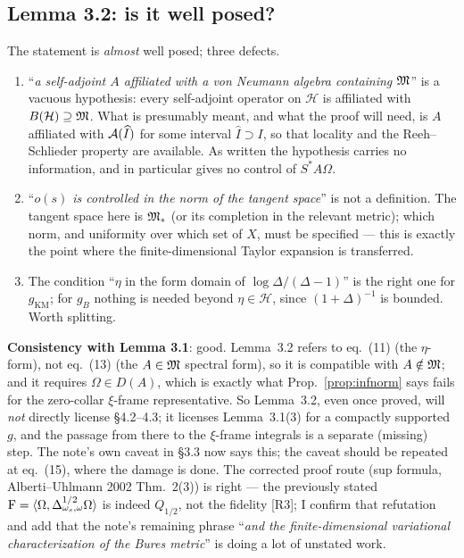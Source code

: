 \documentclass[11pt]{article}
\begin{document}
\subsection{Lemma 3.2: is it well posed?}
\begin{verdictgap}
The statement is \emph{almost} well posed; three defects.
\begin{enumerate}[leftmargin=1.6em]
\item ``\emph{a self-adjoint $A$ affiliated with a von Neumann algebra containing $\mathfrak M$}'' is a vacuous
hypothesis: every self-adjoint operator on $\mathcal H$ is affiliated with $B(\mathcal H)\supseteq\mathfrak M$.  What is
presumably meant, and what the proof will need, is $A$ affiliated with $\mathcal A(\widehat I)$ for some interval
$\widehat I\supset I$, so that locality and the Reeh--Schlieder property are available.  As written the
hypothesis carries no information, and in particular gives no control of $S^*A\Omega$.
\item ``\emph{$o(s)$ is controlled in the norm of the tangent space}'' is not a definition.  The tangent space
here is $\mathfrak M_*$ (or its completion in the relevant metric); which norm, and uniformity over which set of $X$,
must be specified --- this is exactly the point where the finite-dimensional Taylor expansion is transferred.
\item The condition ``$\eta$ in the form domain of $\log\Delta/(\Delta-1)$'' is the right one for
$g_{\mathrm{KM}}$; for $g_B$ nothing is needed beyond $\eta\in\mathcal H$, since $(1+\Delta)^{-1}$ is bounded.
Worth splitting.
\end{enumerate}
\textbf{Consistency with Lemma 3.1}: good.  Lemma~3.2 refers to eq.~(11) (the $\eta$-form), not eq.~(13) (the
$A\in\mathfrak M$ spectral form), so it is compatible with $A\notin\mathfrak M$; and it requires $\Omega\in D(A)$, which is
exactly what Prop.~\ref{prop:infnorm} says fails for the zero-collar $\xi$-frame representative.  So Lemma~3.2,
even once proved, will \emph{not} directly license \S4.2--4.3; it licenses Lemma~3.1(3) for a compactly
supported $g$, and the passage from there to the $\xi$-frame integrals is a separate (missing) step.  The note's
own caveat in \S3.3 now says this; the caveat should be repeated at eq.~(15), where the damage is done.
The corrected proof route (sup formula, Alberti--Uhlmann 2002 Thm.~2(3)) is right --- the previously stated
$\operatorname{F}=\langle\Omega,\Delta_{\omega_s,\omega}^{1/2}\Omega\rangle$ is indeed $Q_{1/2}$, not the fidelity [R3];
I confirm that refutation and add that the note's remaining phrase ``\emph{and the finite-dimensional variational
characterization of the Bures metric}'' is doing a lot of unstated work.
\end{verdictgap}
\end{document}
